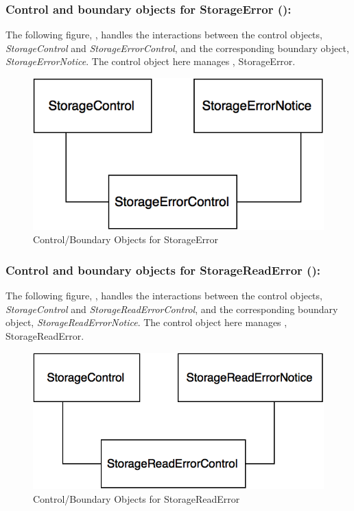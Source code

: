 \documentclass[12pt,letterpaper]{article}
\begin{document}
\subsubsection*{Control and boundary objects for StorageError ():}

The following figure, , handles the interactions between the control objects, {\it StorageControl} and {\it StorageErrorControl}, and the corresponding boundary object, 
{\it StorageErrorNotice}. The control object here manages , StorageError.

\begin{figure}[H]
	\centering{}
	\includegraphics[scale=0.37]{imgs/cbod/storage-error.png}
	\caption{Control/Boundary Objects for StorageError}
\end{figure}

\newpage{}

\subsubsection*{Control and boundary objects for StorageReadError ():}

The following figure, , handles the interactions between the control objects, {\it StorageControl} and {\it StorageReadErrorControl}, and the corresponding boundary object, 
{\it StorageReadErrorNotice}. The control object here manages , StorageReadError.

\begin{figure}[H]
	\centering{}
	\includegraphics[scale=0.37]{imgs/cbod/storage-read-error.png}
	\caption{Control/Boundary Objects for StorageReadError}
\end{figure}
\end{document}
